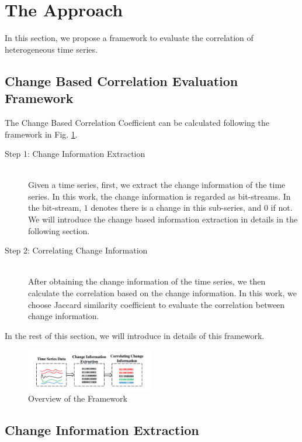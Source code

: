 \section{The Approach}
\label{sec:framework}
In this section, we propose a framework to evaluate the correlation of heterogeneous time series.

\subsection{Change Based Correlation Evaluation Framework}

The Change Based Correlation Coefficient can be calculated following the framework in Fig. \ref{fig:frame}.

\begin{description}
  \item[Step 1: Change Information Extraction] \hfill \\
  Given a time series, first, we extract the change information of the time series. 
  In this work, the change information is regarded  as bit-streams. In the bit-stream, $1$ denotes there is a change in this sub-series, and $0$ if not. 
  We will introduce the change based information extraction in details in the following section.
  \item[Step 2: Correlating Change Information] \hfill \\
  After obtaining the change information of the time series, we then calculate the correlation based on the change information. In this work, we choose Jaccard similarity\cite{han2011data} coefficient to evaluate the correlation between change information.
\end{description}

In the rest of this section, we will introduce in details of this framework.

\begin{figure}[t]
\centering
\includegraphics[width=0.5\textwidth]{framework.pdf}
\caption{Overview of the Framework}
\label{fig:frame}
\end{figure}

\subsection{Change Information Extraction}
\label{ChangeCorrelation}

